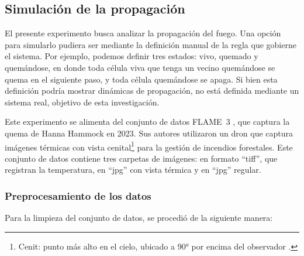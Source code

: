 \subsection{Simulación de la propagación}

El presente experimento busca analizar la propagación del fuego. Una opción para simularlo pudiera ser mediante la definición manual de la regla que gobierne el sistema. Por ejemplo, podemos definir tres estados: vivo, quemado y quemándose, en donde toda célula viva que tenga un vecino quemándose se quema en el siguiente paso, y toda célula quemándose se apaga. Si bien esta definición podría mostrar dinámicas de propagación, no está definida mediante un sistema real, objetivo de esta investigación.

Este experimento se alimenta del conjunto de datos FLAME~3 \cite{hopkins2024flame3datasetunleashing}, que captura la quema de Hanna Hammock en 2023. Sus autores utilizaron un dron que captura imágenes térmicas con vista cenital\footnote{Cenit: punto más alto en el cielo, ubicado a 90° por encima del observador \cite{plano_cenital}.} para la gestión de incendios forestales. Este conjunto de datos contiene tres carpetas de imágenes: en formato ``tiff'', que registran la temperatura, en ``jpg'' con vista térmica y en ``jpg'' regular.

\subsubsection{Preprocesamiento de los datos}

Para la limpieza del conjunto de datos, se procedió de la siguiente manera: 


